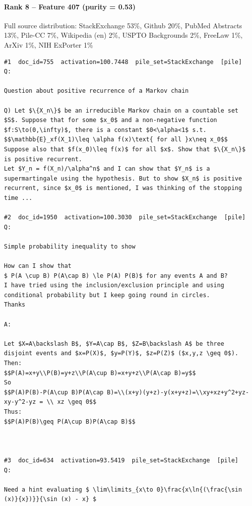 \paragraph*{Rank 8 -- Feature 407 (purity = 0.53)}

Full source distribution: StackExchange 53\%, Github 20\%, PubMed Abstracts 13\%, Pile-CC 7\%, Wikipedia (en) 2\%, USPTO Backgrounds 2\%, FreeLaw 1\%, ArXiv 1\%, NIH ExPorter 1\%

\begin{verbatim}
#1  doc_id=755  activation=100.7448  pile_set=StackExchange  [pile]
Q:

Question about positive recurrence of a Markov chain

Q) Let $\{X_n\}$ be an irreducible Markov chain on a countable set $S$. Suppose that for some $x_0$ and a non-negative function $f:S\to(0,\infty)$, there is a constant $0<\alpha<1$ s.t. 
$$\mathbb{E}_xf(X_1)\leq \alpha f(x)\text{ for all }x\neq x_0$$
Suppose also that $f(x_0)\leq f(x)$ for all $x$. Show that $\{X_n\}$ is positive recurrent.
Let $Y_n = f(X_n)/\alpha^n$ and I can show that $Y_n$ is a supermartingale using the hypothesis. But to show $X_n$ is positive recurrent, since $x_0$ is mentioned, I was thinking of the stopping time ...

#2  doc_id=1950  activation=100.3030  pile_set=StackExchange  [pile]
Q:

Simple probability inequality to show

How can I show that 
$ P(A \cup B) P(A\cap B) \le P(A) P(B)$ for any events A and B?
I have tried using the inclusion/exclusion principle and using conditional probability but I keep going round in circles.
Thanks

A:

Let $X=A\backslash B$, $Y=A\cap B$, $Z=B\backslash A$ be three disjoint events and $x=P(X)$, $y=P(Y)$, $z=P(Z)$ ($x,y,z \geq 0$). 
Then:
$$P(A)=x+y\\P(B)=y+z\\P(A\cup B)=x+y+z\\P(A\cap B)=y$$
So
$$P(A)P(B)-P(A\cup B)P(A\cap B)=\\(x+y)(y+z)-y(x+y+z)=\\xy+xz+y^2+yz-xy-y^2-yz = \\ xz \geq 0$$
Thus:
$$P(A)P(B)\geq P(A\cup B)P(A\cap B)$$



#3  doc_id=634  activation=93.5419  pile_set=StackExchange  [pile]
Q:

Need a hint evaluating $ \lim\limits_{x\to 0}\frac{x\ln{(\frac{\sin (x)}{x})}}{\sin (x) - x} $


\end{verbatim}
